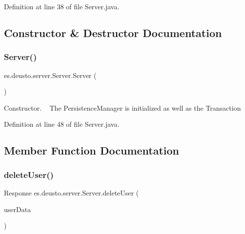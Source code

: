 Definition at line 38 of file Server.\+java.



\subsection{Constructor \& Destructor Documentation}
\mbox{\label{classes_1_1deusto_1_1server_1_1_server_a84f78162a65dd737f224eb2f94c43023}} 
\subsubsection{\texorpdfstring{Server()}{Server()}}
{\footnotesize\ttfamily es.\+deusto.\+server.\+Server.\+Server (\begin{DoxyParamCaption}{ }\end{DoxyParamCaption})}

Constructor. ~\newline
The Persistence\+Manager is initialized as well as the Transaction 

Definition at line 48 of file Server.\+java.



\subsection{Member Function Documentation}
\mbox{\label{classes_1_1deusto_1_1server_1_1_server_a97535594f4d5406d52e93e093cf6c5bd}} 
\subsubsection{\texorpdfstring{delete\+User()}{deleteUser()}}
{\footnotesize\ttfamily Response es.\+deusto.\+server.\+Server.\+delete\+User (\begin{DoxyParamCaption}\item[{\hyperlink{classes_1_1deusto_1_1serialization_1_1_user_data}{User\+Data}}]{user\+Data }\end{DoxyParamCaption})}

